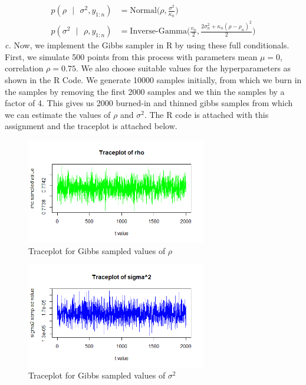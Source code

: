 \documentclass[11pt]{article}
\begin{document}
\begin{equation}
  \nonumber
  \begin{aligned}
    p(\rho \text{ } | \text{ } \sigma^2, y_{1:n}) & = \text{Normal}\bigg(\rho, \frac{\sigma^2}{\kappa_n}\bigg)\\
    p(\sigma^2 \text{ } | \text{ } \rho, y_{1:n}) & = \text{Inverse-Gamma}\bigg(\frac{v_n}{2}, \frac{2\sigma_n^2+\kappa_n(\rho-\rho_n)^2}{2}\bigg)
  \end{aligned}
\end{equation}
\emph{c.} Now, we implement the Gibbs sampler in R by using these full conditionals. First, we simulate 500 points from this process with parameters mean $\mu = 0$, correlation $\rho = 0.75$. We also choose suitable values for the hyperparameters as shown in the R Code. We generate 10000 samples initially, from which we burn in the samples by removing the first 2000 samples and we thin the samples by a factor of 4. This gives us 2000 burned-in and thinned gibbs samples from which we can estimate the values of $\rho$ and $\sigma^2$. The R code is attached with this assignment and the traceplot is attached below.
\begin{figure}[H]
  \centering
  \includegraphics[width = 0.7\textwidth]{4-1.png}
  \caption{Traceplot for Gibbs sampled values of $\rho$}
\end{figure}
\begin{figure}[H]
  \centering
  \includegraphics[width = 0.7\textwidth]{4-2.png}
  \caption{Traceplot for Gibbs sampled values of $\sigma^2$}
\end{figure}
\end{document}
